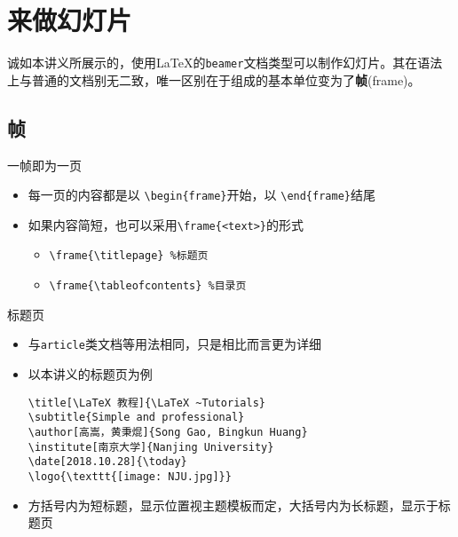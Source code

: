 \section{来做幻灯片}
\begin{frame}
	诚如本讲义所展示的，使用\LaTeX 的\texttt{beamer}文档类型可以制作幻灯片。其在语法上与普通的文档别无二致，唯一区别在于组成的基本单位变为了\textbf{帧}(frame)。
\end{frame}

\subsection{帧}
\begin{frame}[fragile]{一帧即为一页}
	\begin{itemize}
		\item 每一页的内容都是以 \verb|\begin{frame}|开始，以 \verb|\end{frame}|结尾
		\item 如果内容简短，也可以采用\verb|\frame{<text>}|的形式
		\begin{itemize}
			\item \verb|\frame{\titlepage} %标题页| 
			\item \verb|\frame{\tableofcontents} %目录页|
		\end{itemize}
	\end{itemize}	
\end{frame}
\begin{frame}[fragile]{标题页}
	\begin{itemize}
		\item 与\texttt{article}类文档等用法相同，只是相比而言更为详细
		\item 以本讲义的标题页为例
\begin{lstlisting}
\title[\LaTeX 教程]{\LaTeX ~Tutorials}
\subtitle{Simple and professional}
\author[高嵩，黄秉焜]{Song Gao, Bingkun Huang}
\institute[南京大学]{Nanjing University}
\date[2018.10.28]{\today}
\logo{\texttt{[image: NJU.jpg]}}
\end{lstlisting}
		\item 方括号内为短标题，显示位置视主题模板而定，大括号内为长标题，显示于标题页
	\end{itemize}
\end{frame}
